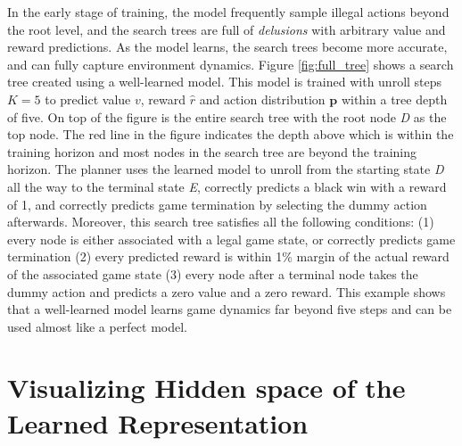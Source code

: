 In the early stage of training, the model frequently sample illegal actions beyond the root level, and the search trees are full of \textit{delusions} with arbitrary value and reward predictions.
As the model learns, the search trees become more accurate, and can fully capture environment dynamics.
Figure \ref{fig:full_tree} shows a search tree created using a well-learned model.
This model is trained with unroll steps $K = 5$ to predict value \(v\), reward \(\hat{r}\) and action distribution \(\mathbf{p}\) within a tree depth of five.
On top of the figure is the entire search tree with the root node \textit{D} as the top node.
The red line in the figure indicates the depth above which is within the training horizon and most nodes in the search tree are beyond the training horizon.
The planner uses the learned model to unroll from the starting state \textit{D} all the way to the terminal state \textit{E}, correctly predicts a black win with a reward of 1, and correctly predicts game termination by selecting the dummy action afterwards.
Moreover, this search tree satisfies all the following conditions: (1) every node is either associated with a legal game state, or correctly predicts game termination (2) every predicted reward is within 1\% margin of the actual reward of the associated game state (3) every node after a terminal node takes the dummy action and predicts a zero value and a zero reward.
This example shows that a well-learned model learns game dynamics far beyond five steps and can be used almost like a perfect model.


\section{Visualizing Hidden space of the Learned Representation} \label{sec:exp:tsne}


